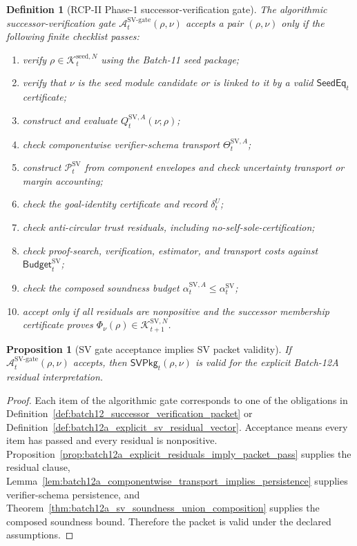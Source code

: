 \documentclass[11pt]{article}
\newtheorem{proposition}[theorem]{Proposition}
\newtheorem{definition}[theorem]{Definition}
\newcommand{\Acal}{\mathcal{A}}
\newcommand{\Pcal}{\mathcal{P}}
\newcommand{\1}{\mathbf{1}}
\providecommand{\Kcal}{\mathcal{K}}
\begin{document}
\begin{definition}[RCP-II Phase-1 successor-verification gate]
\label{def:batch12a_algorithmic_sv_gate}
The algorithmic successor-verification gate \(\Acal_t^{\mathrm{SV\mbox{-}gate}}(\rho,\nu)\) accepts a pair \((\rho,\nu)\) only if the following finite checklist passes:
\begin{enumerate}[label=(\arabic*),leftmargin=1.5em]
    \item verify \(\rho\in\Kcal_t^{\mathrm{seed},N}\) using the Batch-11 seed package;
    \item verify that \(\nu\) is the seed module candidate or is linked to it by a valid \(\mathsf{SeedEq}_t\) certificate;
    \item construct and evaluate \(Q_t^{\mathrm{SV},A}(\nu;\rho)\);
    \item check componentwise verifier-schema transport \(\Theta_t^{\mathrm{SV},A}\);
    \item construct \(\Pcal_t^{\mathrm{SV}}\) from component envelopes and check uncertainty transport or margin accounting;
    \item check the goal-identity certificate and record \(\delta_t^U\);
    \item check anti-circular trust residuals, including no-self-sole-certification;
    \item check proof-search, verification, estimator, and transport costs against \(\mathsf{Budget}_t^{\mathrm{SV}}\);
    \item check the composed soundness budget \(\alpha_t^{\mathrm{SV},A}\le\alpha_t^{\mathrm{SV}}\);
    \item accept only if all residuals are nonpositive and the successor membership certificate proves \(\Phi_\nu(\rho)\in\Kcal_{t+1}^{\mathrm{SV},N}\).
\end{enumerate}
\end{definition}

\begin{proposition}[SV gate acceptance implies SV packet validity]
\label{prop:batch12a_sv_gate_acceptance_implies_packet_validity}
If \(\Acal_t^{\mathrm{SV\mbox{-}gate}}(\rho,\nu)\) accepts, then \(\mathsf{SVPkg}_t(\rho,\nu)\) is valid for the explicit Batch-12A residual interpretation.
\end{proposition}

\begin{proof}
Each item of the algorithmic gate corresponds to one of the obligations in Definition~\ref{def:batch12_successor_verification_packet} or Definition~\ref{def:batch12a_explicit_sv_residual_vector}.  Acceptance means every item has passed and every residual is nonpositive.  Proposition~\ref{prop:batch12a_explicit_residuals_imply_packet_pass} supplies the residual clause, Lemma~\ref{lem:batch12a_componentwise_transport_implies_persistence} supplies verifier-schema persistence, and Theorem~\ref{thm:batch12a_sv_soundness_union_composition} supplies the composed soundness bound.  Therefore the packet is valid under the declared assumptions.
\end{proof}
\end{document}
